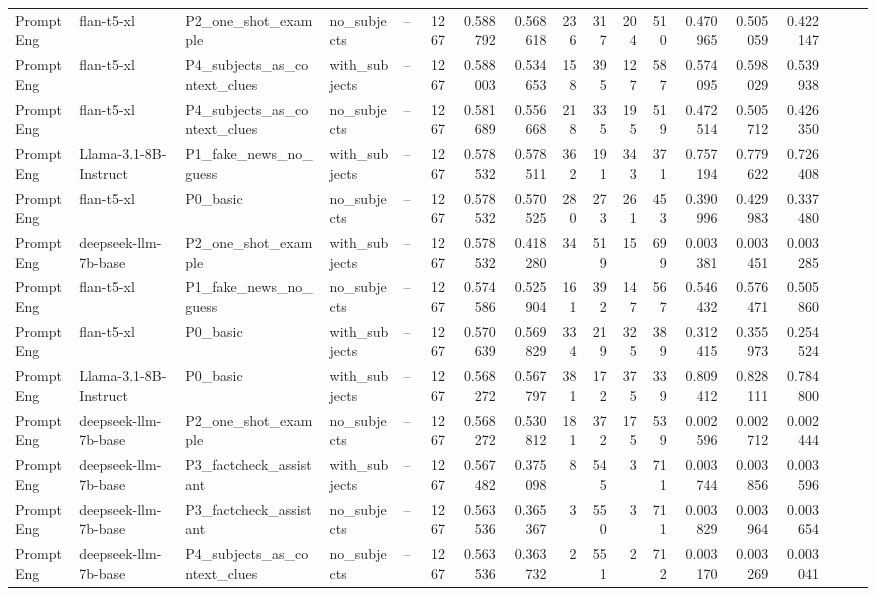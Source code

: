 \begin{landscape}
\begin{longtable}{l P{2.9cm} P{4cm} l P{2.2cm} r r r r r r r r r r r r r}
PromptEng & flan-t5-xl & P2\_one\_shot\_example & no\_subjects & -- & 1267 & 0.588792 & 0.568618 & 236 & 317 & 204 & 510 & 0.470965 & 0.505059 & 0.422147\\
PromptEng & flan-t5-xl & P4\_subjects\_as\_context\_clues & with\_subjects & -- & 1267 & 0.588003 & 0.534653 & 158 & 395 & 127 & 587 & 0.574095 & 0.598029 & 0.539938\\
PromptEng & flan-t5-xl & P4\_subjects\_as\_context\_clues & no\_subjects & -- & 1267 & 0.581689 & 0.556668 & 218 & 335 & 195 & 519 & 0.472514 & 0.505712 & 0.426350\\
PromptEng & Llama-3.1-8B-Instruct & P1\_fake\_news\_no\_guess & with\_subjects & -- & 1267 & 0.578532 & 0.578511 & 362 & 191 & 343 & 371 & 0.757194 & 0.779622 & 0.726408\\
PromptEng & flan-t5-xl & P0\_basic & no\_subjects & -- & 1267 & 0.578532 & 0.570525 & 280 & 273 & 261 & 453 & 0.390996 & 0.429983 & 0.337480\\
PromptEng & deepseek-llm-7b-base & P2\_one\_shot\_example & with\_subjects & -- & 1267 & 0.578532 & 0.418280 & 34 & 519 & 15 & 699 & 0.003381 & 0.003451 & 0.003285\\
PromptEng & flan-t5-xl & P1\_fake\_news\_no\_guess & no\_subjects & -- & 1267 & 0.574586 & 0.525904 & 161 & 392 & 147 & 567 & 0.546432 & 0.576471 & 0.505860\\
PromptEng & flan-t5-xl & P0\_basic & with\_subjects & -- & 1267 & 0.570639 & 0.569829 & 334 & 219 & 325 & 389 & 0.312415 & 0.355973 & 0.254524\\
PromptEng & Llama-3.1-8B-Instruct & P0\_basic & with\_subjects & -- & 1267 & 0.568272 & 0.567797 & 381 & 172 & 375 & 339 & 0.809412 & 0.828111 & 0.784800\\
PromptEng & deepseek-llm-7b-base & P2\_one\_shot\_example & no\_subjects & -- & 1267 & 0.568272 & 0.530812 & 181 & 372 & 175 & 539 & 0.002596 & 0.002712 & 0.002444\\
PromptEng & deepseek-llm-7b-base & P3\_factcheck\_assistant & with\_subjects & -- & 1267 & 0.567482 & 0.375098 & 8 & 545 & 3 & 711 & 0.003744 & 0.003856 & 0.003596\\
PromptEng & deepseek-llm-7b-base & P3\_factcheck\_assistant & no\_subjects & -- & 1267 & 0.563536 & 0.365367 & 3 & 550 & 3 & 711 & 0.003829 & 0.003964 & 0.003654\\
PromptEng & deepseek-llm-7b-base & P4\_subjects\_as\_context\_clues & no\_subjects & -- & 1267 & 0.563536 & 0.363732 & 2 & 551 & 2 & 712 & 0.003170 & 0.003269 & 0.003041\\

\end{longtable}
\end{landscape}
